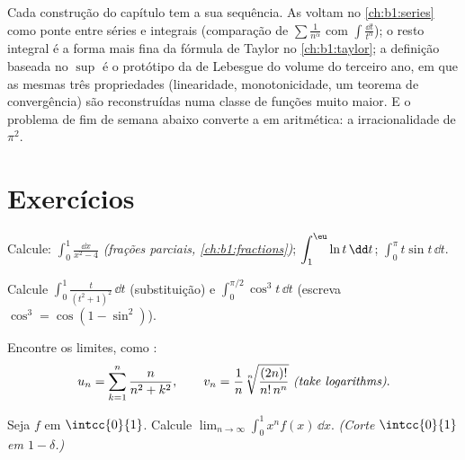 \begin{remark}
Cada construção do capítulo tem a sua sequência. As 
voltam no \cref{ch:b1:series} como ponte entre séries e
integrais (comparação de $\sum \frac{1}{n^\alpha}$ com $\int
\frac{\dd t}{t^\alpha}$); o resto integral é a forma mais fina
da fórmula de Taylor no \cref{ch:b1:taylor}; a definição
baseada no $\sup$ é o protótipo da  de Lebesgue
do volume do terceiro ano, em que as mesmas três propriedades
(linearidade, monotonicidade, um teorema de convergência) são
reconstruídas numa classe de funções muito maior. E o problema de fim
de semana abaixo converte a  em aritmética: a
irracionalidade de $\pi^2$.
\end{remark}

\section{Exercícios}

\begin{exercise}[$\star$]\label{exo:b1:integration:1}
Calcule: $\displaystyle\int_0^1 \frac{\dd x}{x^2 - 4}$
\emph{(frações parciais, \cref{ch:b1:fractions})};
$\displaystyle\int_1^{\eu} \ln t \,\dd t$;
$\displaystyle\int_0^{\pi} t \sin t\, \dd t$.
\end{exercise}

\begin{exercise}[$\star$]\label{exo:b1:integration:2}
Calcule $\displaystyle\int_0^{1} \frac{t}{(t^2+1)^2}\,\dd t$
(substituição) e
$\displaystyle\int_0^{\pi/2} \cos^3 t\, \dd t$ (escreva $\cos^3 =
\cos(1 - \sin^2)$).
\end{exercise}

\begin{exercise}[$\star$]\label{exo:b1:integration:3}
Encontre os limites, como :
\[
u_n = \sum_{k=1}^{n} \frac{n}{n^2 + k^2},
\qquad
v_n = \frac{1}{n}\sqrt[n]{\frac{(2n)!}{n!\,n^n}}
\ \emph{(take logarithms)}.
\]
\end{exercise}

\begin{exercise}[$\star$]\label{exo:b1:integration:4}
Seja $f$  em $\intcc{0}{1}$. Calcule $\lim_{n\to\infty}
\int_0^1 x^n f(x)\,\dd x$. \emph{(Corte $\intcc{0}{1}$ em $1 -
\delta$.)}
\end{exercise}

